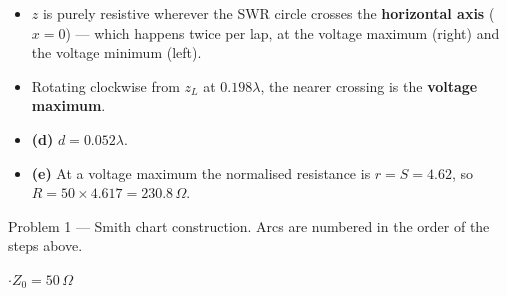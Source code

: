 \begin{itemize}
  \item $z$ is purely resistive wherever the SWR circle crosses the \textbf{horizontal axis} ($x = 0$) --- which happens twice per lap, at the voltage maximum (right) and the voltage minimum (left).
  \item Rotating clockwise from $z_L$ at $0.198\lambda$, the nearer crossing is the \textbf{voltage maximum}.
  \item \textbf{(d)} $\boxed{d = 0.052\lambda}$.
  \item \textbf{(e)} At a voltage maximum the normalised resistance is $r = S = 4.62$, so $R = 50 \times 4.617 = \boxed{230.8\,\Omega}$.
\end{itemize}

{\footnotesize\color{sub} Problem 1 --- Smith chart construction. Arcs are numbered in the order of the steps above.}

\vspace{2pt}

{\color{sub}\footnotesize {} \gap$\cdot$\gap $Z_0 = 50\,\Omega$}

